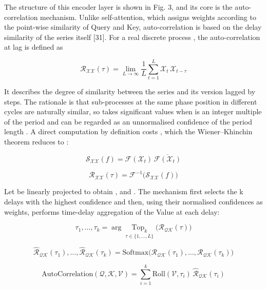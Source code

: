 \documentclass{iopjournal}
\begin{document}
The structure of this encoder layer is shown in Fig. 3, and its core is the auto-correlation mechanism. Unlike self-attention, which assigns weights according to the point-wise similarity of Query and Key, auto-correlation is based on the delay similarity of the series itself [31]. For a real discrete process , the auto-correlation at lag  is defined as

\begin{equation}
\mathcal{R}_{\mathcal{XX}}(\tau) = \lim_{L\to\infty}\frac{1}{L}\sum_{t=1}^{L}\mathcal{X}_t\,\mathcal{X}_{t-\tau}
\end{equation}

It describes the degree of similarity between the series and its version lagged by  steps. The rationale is that sub-processes at the same phase position in different cycles are naturally similar, so  takes significant values when  is an integer multiple of the period and can be regarded as an unnormalised confidence of the period length . A direct computation by definition costs , which the Wiener--Khinchin theorem reduces to :

\begin{equation}
\mathcal{S}_{\mathcal{XX}}(f) = \mathcal{F}(\mathcal{X}_t)\,\overline{\mathcal{F}(\mathcal{X}_t)}
\end{equation}

\begin{equation}
\mathcal{R}_{\mathcal{XX}}(\tau) = \mathcal{F}^{-1}\big(\mathcal{S}_{\mathcal{XX}}(f)\big)
\end{equation}

Let  be linearly projected to obtain ,  and . The mechanism first selects the k delays with the highest confidence and then, using their normalised confidences as weights, performs time-delay aggregation of the Value at each delay:

\begin{equation}
\tau_1,\ldots,\tau_k = \arg\underset{\tau\in\{1,\ldots,L\}}{\operatorname{Top}_k}\big(\mathcal{R}_{\mathcal{QK}}(\tau)\big)
\end{equation}

\begin{equation}
\hat{\mathcal{R}}_{\mathcal{QK}}(\tau_1),\ldots,\hat{\mathcal{R}}_{\mathcal{QK}}(\tau_k) = \text{Softmax}\big(\mathcal{R}_{\mathcal{QK}}(\tau_1),\ldots,\mathcal{R}_{\mathcal{QK}}(\tau_k)\big)
\end{equation}

\begin{equation}
\text{AutoCorrelation}(\mathcal{Q},\mathcal{K},\mathcal{V}) = \sum_{i=1}^{k}\text{Roll}(\mathcal{V},\tau_i)\,\hat{\mathcal{R}}_{\mathcal{QK}}(\tau_i)
\end{equation}
\end{document}
